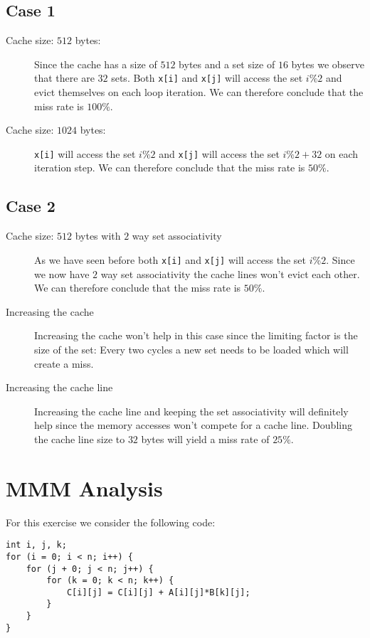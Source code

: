 \documentclass[portrait,a4paper]{article}
\begin{document}
\subsection{Case 1}
\begin{description}
\item[Cache size: $512$ bytes:]
    Since the cache has a size of $512$ bytes and a set size of $16$ bytes we observe that there are $32$ sets.
Both \lstinline{x[i]} and \lstinline{x[j]} will access the set $i\% 2$ and evict themselves on each loop iteration. We can therefore conclude that the miss rate is $100\%$.
\item[Cache size: $1024$ bytes:] \lstinline{x[i]} will access the set $i\% 2$ and \lstinline{x[j]} will access the set $i\% 2 + 32$ on each iteration step. We can therefore conclude that the miss rate is $50\%$.

\end{description}

\subsection{Case 2}
\begin{description}
\item[Cache size: $512$ bytes with $2$ way set associativity] As we have seen before both \lstinline{x[i]} and \lstinline{x[j]} will access the set $i\% 2$. Since we now have $2$ way set associativity the cache lines won't evict each other. We can therefore conclude that the miss rate is $50\%$. 
\item[Increasing the cache] Increasing the cache won't help in this case since the limiting factor is the size of the set: Every two cycles a new set needs to be loaded which will create a miss. 
\item[Increasing the cache line] Increasing the cache line and keeping the set associativity will definitely help since the memory accesses won't compete for a cache line. Doubling the cache line size to $32$ bytes will yield a miss rate of $25\% $.
\end{description}

\section{MMM Analysis}

For this exercise we consider the following code:
\begin{lstlisting}
int i, j, k;
for (i = 0; i < n; i++) {
    for (j + 0; j < n; j++) {
        for (k = 0; k < n; k++) {
            C[i][j] = C[i][j] + A[i][j]*B[k][j];
        }
    }
} 
\end{lstlisting}
\end{document}
